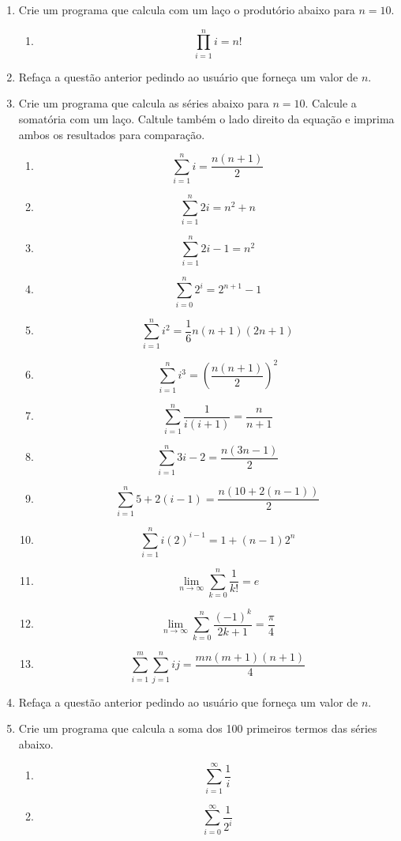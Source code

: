 \begin{enumerate}
  \item Crie um programa que calcula com um laço o produtório abaixo para $n = 10$.
    \begin{enumerate}
      \item \[ \prod_{i = 1}^{n} i = n!\]
    \end{enumerate}

  \item Refaça a questão anterior pedindo ao usuário que forneça um valor de $n$.

  \item Crie um programa que calcula as séries abaixo para $n = 10$. Calcule a somatória com um laço. Caltule também o lado direito da equação e imprima ambos os resultados para comparação.
    \begin{enumerate}
      \item \[ \sum_{i = 1}^{n} i = \frac{n(n+1)}{2}\]
      \item \[ \sum_{i = 1}^{n} 2i = n^2 + n\]
      \item \[ \sum_{i = 1}^{n} 2i - 1 = n^2\]
      \item \[ \sum_{i = 0}^{n} 2^i = 2 ^ {n+1} - 1 \]
      \item \[ \sum_{i = 1}^{n} i^2 = \frac{1}{6} n(n+1)(2n+1) \]
      \item \[ \sum_{i = 1}^{n} i^3 = \left( \frac{n(n+1)}{2} \right)^2 \]
      \item \[ \sum_{i = 1}^{n} \frac{1}{i(i+1)} = \frac{n}{n+1} \]
      \item \[ \sum_{i = 1}^{n} 3i - 2 = \frac{n(3n-1)}{2} \]
      \item \[ \sum_{i = 1}^{n} 5 + 2(i - 1) = \frac{n(10 + 2(n-1))}{2} \]
      \item \[ \sum_{i = 1}^{n} i(2)^{i-1} = 1 + (n-1)2^n \]
      \item \[ \lim_{n \rightarrow \infty}\sum_{k = 0}^{n} \frac{1}{k!} = e \]
      \item \[ \lim_{n \rightarrow \infty}\sum_{k = 0}^{n} \frac{(-1)^k}{2k + 1} = \frac \pi 4 \]
      \item \[ \sum_{i = 1}^{m}\sum_{j = 1}^{n} ij = \frac{mn(m+1)(n+1)}{4} \]
    \end{enumerate}

  \item Refaça a questão anterior pedindo ao usuário que forneça um valor de $n$.
  
  \item Crie um programa que calcula a soma dos 100 primeiros termos das séries abaixo.
    \begin{enumerate}
      \item \[ \sum_{i = 1}^{\infty} \frac{1}{i} \]
      \item \[ \sum_{i = 0}^{\infty} \frac{1}{2^i} \]
    \end{enumerate}


\end{enumerate}
